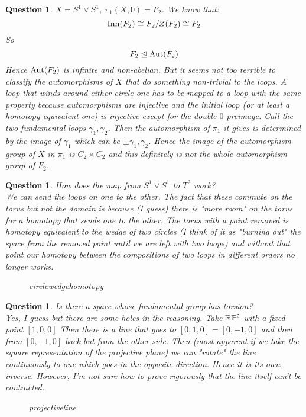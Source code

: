 \documentclass[a4paper]{article}
\newtheorem{que}[thm]{Question}
\begin{document}
\begin{que}$X=S^{1}\vee S^{1}$, $\pi_1(X,0)=F_2$.
     We know that:
     $$\operatorname{Inn}(F_2) \cong F_2/Z(F_2) \cong F_2$$ So $$F_2 \mathrel{\unlhd} \operatorname{Aut}(F_2)$$
     Hence $\operatorname{Aut}(F_2)$ is infinite and non-abelian.
     But it seems not too terrible to classify the automorphisms of $X$ that do something non-trivial to the loops. A loop that winds around either circle one has to be mapped to a loop with the same property because automorphisms are injective and the initial loop (or at least a homotopy-equivalent one) is injective except for the double $0$ preimage. Call the two fundamental loops $\gamma_1,\gamma_2$. Then the automorphism of $\pi_1$ it gives is determined by the image of $\gamma_1$ which can be $\pm\gamma_1,\gamma_2$. Hence the image of the automorphism group of $X$ in $\pi_1$ is $C_2\times C_2$ and this definitely is not the whole automorphism group of $F_2$.
    
\end{que}
\begin{que}
    How does the map from $S^{1}\vee S^{1}$ to $T^{2}$ work?\\
    We can send the loops on one to the other. The fact that these commute on the torus but not the domain is because (I guess) there is "more room" on the torus for a homotopy that sends one to the other. The torus with a point removed is homotopy equivalent to the wedge of two circles (I think of it as "burning out" the space from the removed point until we are left with two loops) and without that point our homotopy between the compositions of two loops in different orders no longer works.  
\begin{figure}[ht]
    \centering
    \caption{circlewedgehomotopy}
    \label{fig:circlewedgehomotopy}
\end{figure}
\end{que}
\begin{que}
    Is there a space whose fundamental group has torsion?\\
    Yes, I guess but there are some holes in the reasoning. Take $\mathbb{R}\mathbb{P}^2$ with a fixed point $\left[ 1,0,0 \right] $ Then there is a line that goes to $[0,1,0]=[0,-1,0]$ and then from $[0,-1,0]$ back but from the other side. Then (most apparent if we take the square representation of the projective plane) we can "rotate" the line continuously to one which goes in the opposite direction. Hence it is its own inverse. However, I'm not sure how to prove rigorously that the line itself can't be contracted.  
\begin{figure}[ht]
    \centering
    \caption{projectiveline}
    \label{fig:projectiveline}
\end{figure}
    
\end{que}
\end{document}
